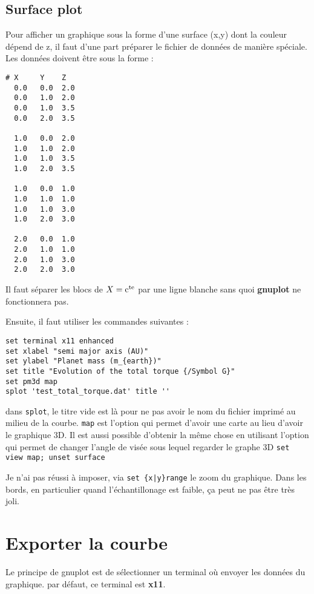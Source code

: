 \documentclass[a4paper,twoside]{article}
\begin{document}
\subsection{Surface plot}
Pour afficher un graphique sous la forme d'une surface (x,y) dont la couleur dépend de z, il faut d'une part préparer le fichier de données de manière spéciale. Les données doivent être sous la forme : 
\begin{verbatim}
# X     Y    Z
  0.0   0.0  2.0
  0.0   1.0  2.0
  0.0   1.0  3.5
  0.0   2.0  3.5

  1.0   0.0  2.0
  1.0   1.0  2.0
  1.0   1.0  3.5
  1.0   2.0  3.5

  1.0   0.0  1.0
  1.0   1.0  1.0
  1.0   1.0  3.0
  1.0   2.0  3.0

  2.0   0.0  1.0
  2.0   1.0  1.0
  2.0   1.0  3.0
  2.0   2.0  3.0
\end{verbatim}

\begin{attention}
Il faut séparer les blocs de $X=\mathrm{c^{te}}$ par une ligne blanche sans quoi \textbf{gnuplot} ne fonctionnera pas.
\end{attention}


Ensuite, il faut utiliser les commandes suivantes :
\begin{verbatim}
set terminal x11 enhanced
set xlabel "semi major axis (AU)"
set ylabel "Planet mass (m_{earth})"
set title "Evolution of the total torque {/Symbol G}"
set pm3d map
splot 'test_total_torque.dat' title ''
\end{verbatim}
dans \texttt{splot}, le titre vide est là pour ne pas avoir le nom du fichier imprimé au milieu de la courbe. \texttt{map} est l'option qui permet d'avoir une carte au lieu d'avoir le graphique 3D. Il est aussi possible d'obtenir la même chose en utilisant l'option qui permet de changer l'angle de visée sous lequel regarder le graphe 3D \texttt{set view map; unset surface}

\begin{remarque}
Je n'ai pas réussi à imposer, via \verb#set {x|y}range# le zoom du graphique. Dans les bords, en particulier quand l'échantillonage est faible, ça peut ne pas être très joli. 
\end{remarque}


\section{Exporter la courbe}\label{sec:terminal}
Le principe de gnuplot est de sélectionner un terminal où envoyer les données du graphique. par défaut, ce terminal est \textbf{x11}. 
\end{document}
